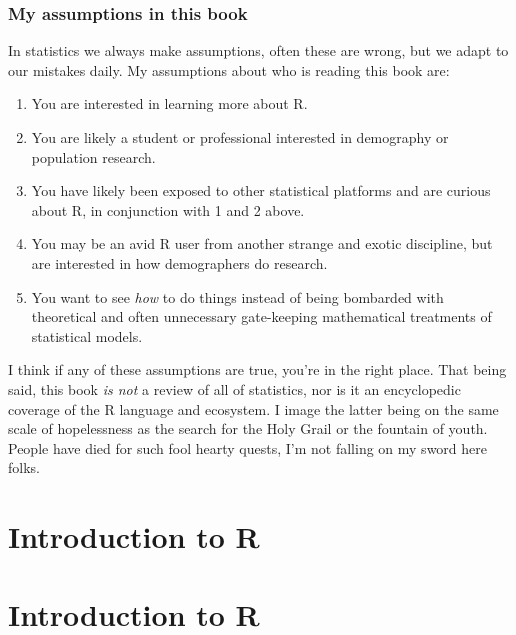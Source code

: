 \documentclass[
  letterpaper,
  DIV=11,
  numbers=noendperiod]{scrreprt}
\begin{document}
\hypertarget{my-assumptions-in-this-book}{%
\subsection{My assumptions in this
book}\label{my-assumptions-in-this-book}}

In statistics we always make assumptions, often these are wrong, but we
adapt to our mistakes daily. My assumptions about who is reading this
book are:

\begin{enumerate}
\def\labelenumi{\arabic{enumi}.}
\item
  You are interested in learning more about R.
\item
  You are likely a student or professional interested in demography or
  population research.
\item
  You have likely been exposed to other statistical platforms and are
  curious about R, in conjunction with 1 and 2 above.
\item
  You may be an avid R user from another strange and exotic discipline,
  but are interested in how demographers do research.
\item
  You want to see \emph{how} to do things instead of being bombarded
  with theoretical and often unnecessary gate-keeping mathematical
  treatments of statistical models.
\end{enumerate}

I think if any of these assumptions are true, you're in the right place.
That being said, this book \emph{is not} a review of all of statistics,
nor is it an encyclopedic coverage of the R language and ecosystem. I
image the latter being on the same scale of hopelessness as the search
for the Holy Grail or the fountain of youth. People have died for such
fool hearty quests, I'm not falling on my sword here folks.


\hypertarget{introduction-to-r}{%
\chapter{Introduction to R}\label{introduction-to-r}}


\hypertarget{introduction-to-r-1}{%
\chapter{Introduction to R}\label{introduction-to-r-1}}
\end{document}

